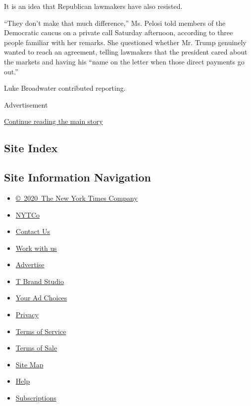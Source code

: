 It is an idea that Republican lawmakers have also resisted.

``They don't make that much difference,'' Ms. Pelosi told members of the
Democratic caucus on a private call Saturday afternoon, according to
three people familiar with her remarks. She questioned whether Mr. Trump
genuinely wanted to reach an agreement, telling lawmakers that the
president cared about the markets and having his ``name on the letter
when those direct payments go out.''

Luke Broadwater contributed reporting.

Advertisement

\protect\hyperlink{after-bottom}{Continue reading the main story}

\hypertarget{site-index}{%
\subsection{Site Index}\label{site-index}}

\hypertarget{site-information-navigation}{%
\subsection{Site Information
Navigation}\label{site-information-navigation}}

\begin{itemize}
\tightlist
\item
  \href{https://help.nytimes.com/hc/en-us/articles/115014792127-Copyright-notice}{©~2020~The
  New York Times Company}
\end{itemize}

\begin{itemize}
\tightlist
\item
  \href{https://www.nytco.com/}{NYTCo}
\item
  \href{https://help.nytimes.com/hc/en-us/articles/115015385887-Contact-Us}{Contact
  Us}
\item
  \href{https://www.nytco.com/careers/}{Work with us}
\item
  \href{https://nytmediakit.com/}{Advertise}
\item
  \href{http://www.tbrandstudio.com/}{T Brand Studio}
\item
  \href{https://www.nytimes.com/privacy/cookie-policy\#how-do-i-manage-trackers}{Your
  Ad Choices}
\item
  \href{https://www.nytimes.com/privacy}{Privacy}
\item
  \href{https://help.nytimes.com/hc/en-us/articles/115014893428-Terms-of-service}{Terms
  of Service}
\item
  \href{https://help.nytimes.com/hc/en-us/articles/115014893968-Terms-of-sale}{Terms
  of Sale}
\item
  \href{https://spiderbites.nytimes.com}{Site Map}
\item
  \href{https://help.nytimes.com/hc/en-us}{Help}
\item
  \href{https://www.nytimes.com/subscription?campaignId=37WXW}{Subscriptions}
\end{itemize}

